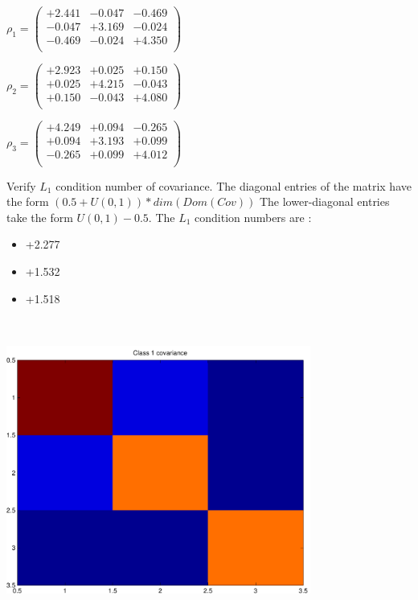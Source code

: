 \documentclass[9pt]{article}
\theoremstyle{plain}
\theoremstyle{definition}
\theoremstyle{remark}
\numberwithin{equation}{section}
\begin{document}
$\rho_1 = \left(
\begin{array}{
ccc}
+2.441 & -0.047 & -0.469 \\
-0.047 & +3.169 & -0.024 \\
-0.469 & -0.024 & +4.350 \\
\end{array}
\right)$ \newline 

$\rho_2 = \left(
\begin{array}{
ccc}
+2.923 & +0.025 & +0.150 \\
+0.025 & +4.215 & -0.043 \\
+0.150 & -0.043 & +4.080 \\
\end{array}
\right)$ \newline 

$\rho_3 = \left(
\begin{array}{
ccc}
+4.249 & +0.094 & -0.265 \\
+0.094 & +3.193 & +0.099 \\
-0.265 & +0.099 & +4.012 \\
\end{array}
\right)$ \newline 

Verify $L_1$ condition number of covariance. The diagonal entries of the matrix have the form $(0.5 + U(0,1) )*dim(Dom(Cov))$
The lower-diagonal entries take the form $U(0,1) - 0.5$. 
The $L_1$ condition numbers are :
\begin{itemize}
\item +2.277
\item +1.532
\item +1.518
\end{itemize}
\includegraphics[width=10.0cm,height=10.0cm]{rv1_corr.pdf}
\end{document}
